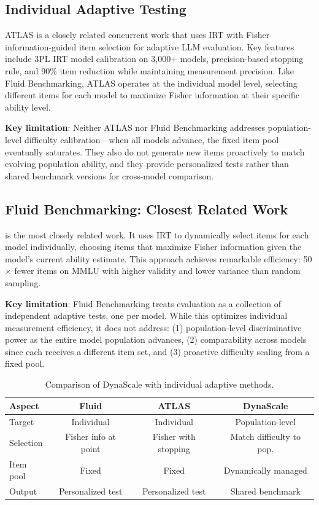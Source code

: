 \documentclass{article}
\begin{document}
\subsection{Individual Adaptive Testing}

ATLAS \citep{li2025atlas} is a closely related concurrent work that uses IRT with Fisher information-guided item selection for adaptive LLM evaluation. Key features include 3PL IRT model calibration on 3,000+ models, precision-based stopping rule, and 90\% item reduction while maintaining measurement precision. Like Fluid Benchmarking, ATLAS operates at the individual model level, selecting different items for each model to maximize Fisher information at their specific ability level.

\textbf{Key limitation}: Neither ATLAS nor Fluid Benchmarking addresses population-level difficulty calibration---when all models advance, the fixed item pool eventually saturates. They also do not generate new items proactively to match evolving population ability, and they provide personalized tests rather than shared benchmark versions for cross-model comparison.

\subsection{Fluid Benchmarking: Closest Related Work}

\citet{hofmann2025fluid} is the most closely related work. It uses IRT to dynamically select items for each model individually, choosing items that maximize Fisher information given the model's current ability estimate. This approach achieves remarkable efficiency: 50$\times$ fewer items on MMLU with higher validity and lower variance than random sampling.

\textbf{Key limitation}: Fluid Benchmarking treats evaluation as a collection of independent adaptive tests, one per model. While this optimizes individual measurement efficiency, it does not address: (1) population-level discriminative power as the entire model population advances, (2) comparability across models since each receives a different item set, and (3) proactive difficulty scaling from a fixed pool.

\begin{table}[t]
\caption{Comparison of DynaScale with individual adaptive methods.}
\label{tab:comparison}
\centering
\begin{tabular}{lccc}
\toprule
\textbf{Aspect} & \textbf{Fluid} & \textbf{ATLAS} & \textbf{DynaScale} \\
\midrule
Target & Individual & Individual & Population-level \\
Selection & Fisher info at point & Fisher with stopping & Match difficulty to pop. \\
Item pool & Fixed & Fixed & Dynamically managed \\
Output & Personalized test & Personalized test & Shared benchmark \\
\bottomrule
\end{tabular}
\end{table}
\end{document}
